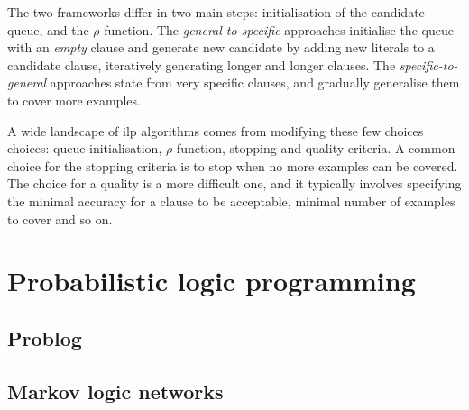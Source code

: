 The two frameworks differ in two main steps: initialisation of the candidate queue, and the $\rho$ function.
The \textit{general-to-specific} approaches initialise the queue with an \textit{empty} clause and generate new candidate by adding new literals to a candidate clause, iteratively generating longer and longer clauses.
The \textit{specific-to-general} approaches state from very specific clauses, and gradually generalise them to cover more examples.




A wide landscape of \gls{ilp} algorithms comes from modifying these few choices choices: queue initialisation, $\rho$ function, stopping and quality criteria.
A common choice for the stopping criteria is to stop when no more examples can be covered.
The choice for a quality is a more difficult one, and it typically involves specifying the minimal accuracy for a clause to be acceptable, minimal number of examples to cover and so on.








\section{Probabilistic logic programming}






\subsection{Problog}


\subsection{Markov logic networks}












\cleardoublepage

